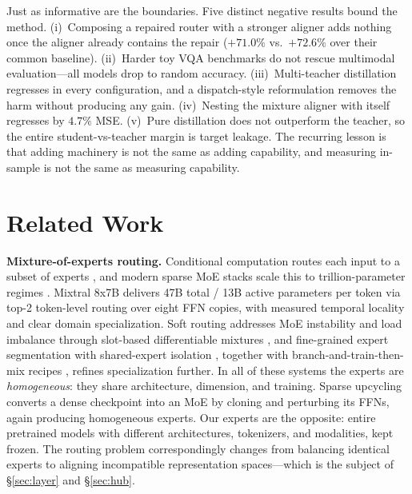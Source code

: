 \documentclass[10pt]{article}
\theoremstyle{definition}
\theoremstyle{plain}
\theoremstyle{remark}
\begin{document}
Just as informative are the boundaries. Five distinct negative results bound the method. (i)~Composing a repaired router with a stronger aligner adds nothing once the aligner already contains the repair ($+71.0\%$ vs.\ $+72.6\%$ over their common baseline). (ii)~Harder toy VQA benchmarks do not rescue multimodal evaluation---all models drop to random accuracy. (iii)~Multi-teacher distillation regresses in every configuration, and a dispatch-style reformulation removes the harm without producing any gain. (iv)~Nesting the mixture aligner with itself regresses by $4.7\%$ MSE. (v)~Pure distillation does not outperform the teacher, so the entire student-vs-teacher margin is target leakage. The recurring lesson is that adding machinery is not the same as adding capability, and measuring in-sample is not the same as measuring capability.

\section{Related Work}
\label{sec:related}

\textbf{Mixture-of-experts routing.} Conditional computation routes each input to a subset of experts \citep{jacobs1991,shazeerOutrageouslyLargeNeural2017}, and modern sparse MoE stacks scale this to trillion-parameter regimes \citep{fedus2022,zoph2022}. Mixtral 8x7B \citep{jiang2024mixtral} delivers 47B total / 13B active parameters per token via top-2 token-level routing over eight FFN copies, with measured temporal locality and clear domain specialization. Soft routing addresses MoE instability and load imbalance through slot-based differentiable mixtures \citep{puigcerver2024softmoe}, and fine-grained expert segmentation with shared-expert isolation \citep{dai2024}, together with branch-and-train-then-mix recipes \citep{sukhbaatar2024btx}, refines specialization further. In all of these systems the experts are \emph{homogeneous}: they share architecture, dimension, and training. Sparse upcycling \citep{komatsuzaki2023} converts a dense checkpoint into an MoE by cloning and perturbing its FFNs, again producing homogeneous experts. Our experts are the opposite: entire pretrained models with different architectures, tokenizers, and modalities, kept frozen. The routing problem correspondingly changes from balancing identical experts to aligning incompatible representation spaces---which is the subject of \S\ref{sec:layer} and \S\ref{sec:hub}.
\end{document}
